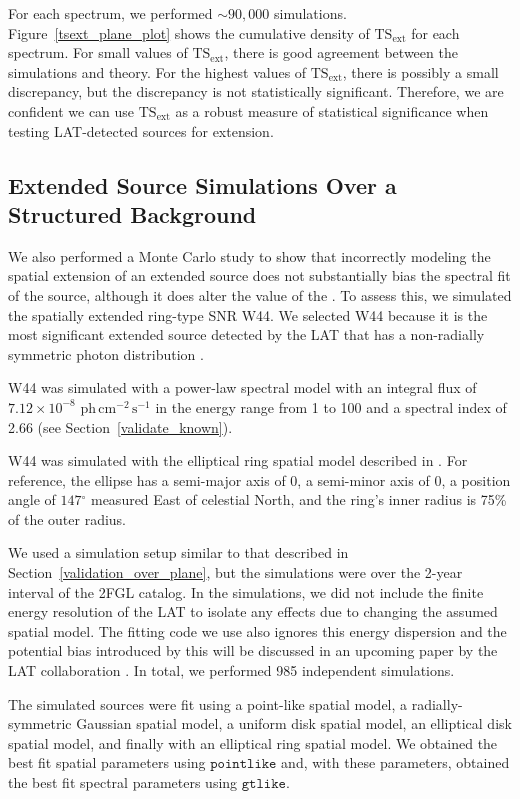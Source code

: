 \documentclass[12pt,preprint]{aastex}
\newcommand{\gev}{\text{GeV}\xspace}
\newcommand{\phflux}{\ensuremath{\text{ph}\,\text{cm}^{-2}\,\text{s}^{-1}}\xspace}
\newcommand{\tsext}{{\ensuremath{\text{TS}_{\text{ext}}}}\xspace}
\newcommand{\ts}{\text{TS}\xspace}
\newcommand{\gtlike}{\ensuremath{\mathtt{gtlike}}\xspace}
\newcommand{\pointlike}{\ensuremath{\mathtt{pointlike}}\xspace}
\newcommand{\degree}{\ensuremath{^\circ}\xspace}
\begin{document}
{For each spectrum, we performed $\sim90,000$ simulations.
Figure~\ref{tsext_plane_plot} shows the cumulative density
of \tsext for each spectrum. For small values of \tsext,
there is good agreement between the simulations and
theory.  For the highest values of \tsext, there is possibly
a small discrepancy, but the discrepancy is not statistically significant.
Therefore, we are confident we can use \tsext as a robust measure of
statistical significance when testing LAT-detected sources for extension.

\subsection{Extended Source Simulations Over a Structured Background}
\label{bias_wrong_spatial_model}

We also performed a Monte Carlo study to show that incorrectly modeling the
spatial extension of an extended source does not substantially bias
the spectral fit of the source, although it does alter the value of the \ts.
To assess this, we simulated the spatially extended ring-type SNR W44.
We selected W44 because it is the most significant extended source detected by the LAT 
that has a non-radially symmetric photon distribution \citep{w44}. 

W44 was simulated with a power-law spectral model with an integral flux
of $7.12\times10^{-8}$ \phflux in the energy range from 1 \gev to 100
\gev and a spectral index of 2.66 (see Section~\ref{validate_known}).

W44 was simulated with the elliptical ring spatial model described in
\cite{w44}. For reference, the ellipse has a semi-major axis of 0,
a semi-minor axis of 0, a position angle of $147\degree$
measured East of celestial North, and the ring's inner radius is 75\% of
the outer radius.

We used a simulation setup similar to that described in
Section~\ref{validation_over_plane}, but the simulations
were over the 2-year interval of the 2FGL catalog.
In the simulations, 
we did not include the finite energy resolution of the LAT
to isolate any effects due to changing the assumed spatial model. 
The fitting code we use also ignores this energy dispersion and the
potential bias introduced by this will be discussed in an upcoming paper
by the LAT collaboration \citep{lat_on_orbit_psf}.
In total, we performed 985 independent simulations.

The simulated sources were fit using a point-like spatial model,
a radially-symmetric Gaussian spatial model, a uniform disk spatial model, 
an elliptical disk spatial model, and finally with an elliptical
ring spatial model.
We obtained the best fit spatial parameters using \pointlike and, 
with these parameters, obtained the best fit spectral parameters 
using \gtlike. 

}
\end{document}
